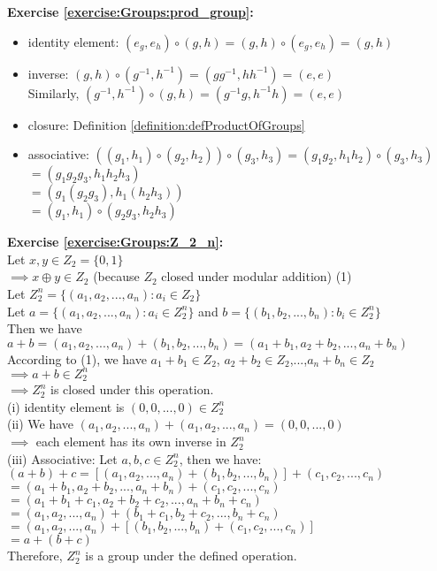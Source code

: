 \noindent\textbf{Exercise \ref{exercise:Groups:prod_group}:}
\begin{itemize}
\item
identity element: $(e_g, e_h) \circ (g, h) = (g, h) \circ (e_g, e_h) = (g, h)$

\item
inverse: $(g, h) \circ (g^{-1}, h^{-1}) = (g g^{-1}, h h^{-1}) = (e, e)$\\
Similarly, $(g^{-1}, h^{-1}) \circ (g, h)  = ( g^{-1} g,  h^{-1}h) = (e, e)$

\item
closure: Definition \ref{definition:defProductOfGroups}

\item
associative: $((g_1, h_1) \circ (g_2, h_2)) \circ (g_3, h_3) = (g_1 g_2, h_1 h_2) \circ (g_3, h_3)$\\
$= (g_1 g_2 g_3, h_1 h_2 h_3)$\\
$= (g_1 (g_2 g_3), h_1 (h_2 h_3))$\\
$= (g_1, h_1) \circ (g_2 g_3, h_2 h_3)$
\end{itemize}

\textbf{Exercise \ref{exercise:Groups:Z_2_n}:}\\
Let $x,y\in Z_2=\{0,1\}$\\
$\implies x\oplus y\in Z_2$ (because $Z_2$ closed under modular addition) (1)\\
Let $Z_2^n=\{(a_1,a_2,...,a_n):a_i\in Z_2\}$\\
Let $a=\{(a_1,a_2,...,a_n):a_i\in Z_2^n\}$ and $b=\{(b_1,b_2,...,b_n):b_i\in Z_2^n\}$\\
Then we have $a+b=(a_1,a_2,...,a_n)+(b_1,b_2,...,b_n)=(a_1+b_1,a_2+b_2,...,a_n+b_n)$\\
According to (1), we have $a_1+b_1\in Z_2$, $a_2+b_2\in Z_2$,...,$a_n+b_n\in Z_2$\\
$\implies a+b\in Z_2^n$\\
$\implies Z_2^n$ is closed under this operation.\\
(i) identity element is $(0,0,...,0)\in Z_2^n$\\
(ii) We have $(a_1,a_2,...,a_n)+(a_1,a_2,...,a_n)=(0,0,...,0)$\\
$\implies$  each element has its own inverse in $Z_2^n$\\
(iii) Associative: Let $a,b,c\in Z_2^n$, then we have:\\
$(a+b)+c =[(a_1,a_2,...,a_n)+(b_1,b_2,...,b_n)]+(c_1,c_2,...,c_n)$\\
$=(a_1+b_1,a_2+b_2,...,a_n+b_n)+(c_1,c_2,...,c_n)$\\
$=(a_1+b_1+c_1,a_2+b_2+c_2,...,a_n+b_n+c_n)$\\
$=(a_1,a_2,...,a_n)+(b_1+c_1,b_2+c_2,...,b_n+c_n)$\\
$=(a_1,a_2,...,a_n)+[(b_1,b_2,...,b_n)+(c_1,c_2,...,c_n)]$\\
$=a+(b+c)$\\
Therefore, $Z_2^n$ is a group under the defined operation.\\
\\


